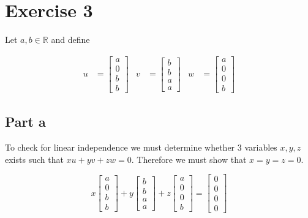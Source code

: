 \section{Exercise 3}
Let $a, b\in\mathbb{R}$ and define

\begin{align*}
	u & = \begin{bmatrix}a\\0\\b\\b\end{bmatrix} &
	v & = \begin{bmatrix}b\\b\\a\\a\end{bmatrix} &
	w & = \begin{bmatrix}a\\0\\0\\b\end{bmatrix}
\end{align*}

\subsection{Part a}

To check for linear independence we must determine whether 3 variables $x,y,z$ exists such that $xu + yv + zw = 0$. Therefore we must show that $x=y=z=0$.

\[
	x\begin{bmatrix}a\\0\\b\\b\end{bmatrix} + y\begin{bmatrix}b\\b\\a\\a\end{bmatrix} + z\begin{bmatrix}a\\0\\0\\b\end{bmatrix} = \begin{bmatrix}0\\0\\0\\0\end{bmatrix}
\]

